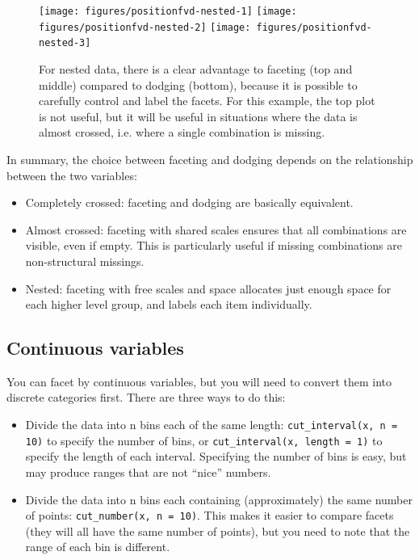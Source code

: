 \begin{figure}
\texttt{[image: figures/positionfvd-nested-1]} \texttt{[image: figures/positionfvd-nested-2]} \texttt{[image: figures/positionfvd-nested-3]} \caption{For nested data, there is a clear advantage to faceting (top and middle) compared to dodging (bottom), because it is possible to carefully control and label the facets.  For this example, the top plot is not useful, but it will be useful in situations where the data is almost crossed, i.e. where a single combination is missing.\label{fig:fvd-nested}}
\end{figure}

In summary, the choice between faceting and dodging depends on the
relationship between the two variables:

\begin{itemize}
\itemsep1pt\parskip0pt
\item
  Completely crossed: faceting and dodging are basically equivalent.
\item
  Almost crossed: faceting with shared scales ensures that all
  combinations are visible, even if empty. This is particularly useful
  if missing combinations are non-structural missings.
\item
  Nested: faceting with free scales and space allocates just enough
  space for each higher level group, and labels each item individually.
\end{itemize}

\subsection{Continuous variables}\label{sub:continuous-variables}

You can facet by continuous variables, but you will need to convert them
into discrete categories first. There are three ways to do this:

\begin{itemize}
\itemsep1pt\parskip0pt
\item
  Divide the data into n bins each of the same length:
  \texttt{cut\_interval(x, n = 10)} to specify the number of bins, or
  \texttt{cut\_interval(x, length = 1)} to specify the length of each
  interval. Specifying the number of bins is easy, but may produce
  ranges that are not ``nice'' numbers. 
\item
  Divide the data into n bins each containing (approximately) the same
  number of points: \texttt{cut\_number(x, n = 10)}. This makes it
  easier to compare facets (they will all have the same number of
  points), but you need to note that the range of each bin is different.
\end{itemize}

